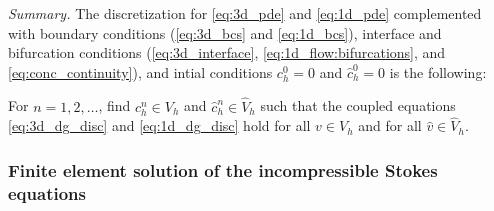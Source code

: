 \documentclass[fleqn,10pt]{wlscirep}
\begin{document}
 \textit{Summary.} The discretization for \eqref{eq:3d_pde} and \eqref{eq:1d_pde} complemented with boundary conditions (\eqref{eq:3d_bcs} and \eqref{eq:1d_bcs}), interface and bifurcation  conditions (\eqref{eq:3d_interface}, \eqref{eq:1d_flow:bifurcations}, and \eqref{eq:conc_continuity}), and intial conditions $c_h^0 =0 $ and $\hat c_h^0 = 0 $ is the following: 

 For $n = 1,2, \ldots $, find  $c_h^n \in V_h$ and $\hat c^n_h \in \hat V_h$ such that the coupled equations \eqref{eq:3d_dg_disc} and \eqref{eq:1d_dg_disc} hold for all $v \in V_h$ and for all $\hat v \in \hat V_h$. 
\subsubsection{Finite element solution of the incompressible Stokes equations}
\end{document}
